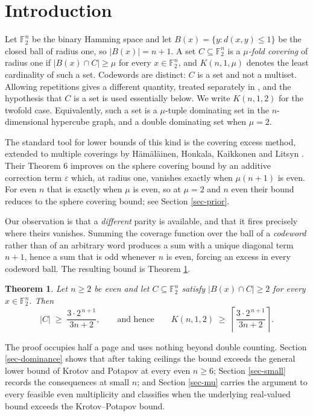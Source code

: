 \documentclass[10pt,a4paper]{article}
\newtheorem{theorem}{Theorem}[section]
\begin{document}
\baselineskip=0.20in

\section{Introduction}

Let $\mathbb{F}_2^n$ be the binary Hamming space and let
$B(x)=\{y: d(x,y)\le 1\}$ be the closed ball of radius one, so $|B(x)|=n+1$.
A set $C\subseteq\mathbb{F}_2^n$ is a \emph{$\mu$-fold covering} of radius one
if $|B(x)\cap C|\ge\mu$ for every $x\in\mathbb{F}_2^n$, and $K(n,1,\mu)$ denotes
the least cardinality of such a set. Codewords are distinct: $C$ is a set and
not a multiset. Allowing repetitions gives a different quantity, treated
separately in \cite{HHKL-1993}, and the hypothesis that $C$ is a set is used
essentially below. We write $K(n,1,2)$ for the twofold case. Equivalently, such
a set is a $\mu$-tuple dominating set in the $n$-dimensional hypercube graph,
and a double dominating set when $\mu=2$.

The standard tool for lower bounds of this kind is the covering excess method,
extended to multiple coverings by H\"am\"al\"ainen, Honkala, Kaikkonen and
Litsyn \cite{HHKL-1993}. Their Theorem 6 improves on the sphere covering bound
by an additive correction term $\varepsilon$ which, at radius one, vanishes
exactly when $\mu(n+1)$ is even. For even $n$ that is exactly when $\mu$ is
even, so at $\mu=2$ and $n$ even their bound reduces to the sphere covering
bound; see Section \ref{sec-prior}.

Our observation is that a \emph{different} parity is available, and that it
fires precisely where theirs vanishes. Summing the coverage function over the
ball of a \emph{codeword} rather than of an arbitrary word produces a sum with
a unique diagonal term $n+1$, hence a sum that is odd whenever $n$ is even,
forcing an excess in every codeword ball. The resulting bound is Theorem
\ref{thm-main}.

\begin{theorem}\label{thm-main}
Let $n\ge 2$ be even and let $C\subseteq\mathbb{F}_2^n$ satisfy
$|B(x)\cap C|\ge 2$ for every $x\in\mathbb{F}_2^n$. Then
\[
  |C| \;\ge\; \frac{3\cdot 2^{\,n+1}}{3n+2},
  \qquad\text{and hence}\qquad
  K(n,1,2) \;\ge\; \left\lceil \frac{3\cdot 2^{\,n+1}}{3n+2} \right\rceil .
\]
\end{theorem}

The proof occupies half a page and uses nothing beyond double counting. Section
\ref{sec-dominance} shows that after taking ceilings the bound exceeds the
general lower bound of Krotov and Potapov \cite{KP-2021} at every even
$n\ge 6$; Section \ref{sec-small} records the consequences at small $n$; and
Section \ref{sec-mu} carries the argument to every feasible even multiplicity
and classifies when the underlying real-valued bound exceeds the
Krotov--Potapov bound.
\end{document}
